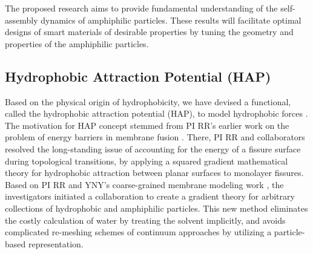 %
%
The proposed research aims to provide fundamental understanding of the self-assembly dynamics of amphiphilic particles.
These results will facilitate optimal designs of smart materials of desirable properties by
tuning the geometry and properties of the amphiphilic particles. 


\subsection{Hydrophobic Attraction Potential (HAP)}
\label{sec:HAP}

Based on the physical origin of hydrophobicity,  we have devised a functional, called the hydrophobic attraction potential (HAP), to
model hydrophobic forces \cite{Fu2018_SIAM}. The motivation for HAP concept stemmed from PI RR's 
earlier work on the problem of energy barriers in membrane fusion \cite{RyKlYaCo16,Chetal16}.
There, PI RR and collaborators resolved the long-standing issue of accounting for the energy of a fissure surface
during topological transitions, by applying a squared gradient mathematical theory 
for hydrophobic attraction between planar surfaces \cite{Eriksson1989,Lum1999,Menshikov2017,Marcelja1977} to monolayer fissures.
Based on PI RR and YNY's coarse-grained membrane modeling work \cite{Fu2017}, 
the investigators initiated a collaboration to create a gradient theory for arbitrary collections 
of hydrophobic and amphiphilic particles. This new method 
eliminates the costly calculation of water by treating the solvent implicitly, 
and avoids complicated re-meshing schemes of continuum approaches
by utilizing a particle-based representation.

